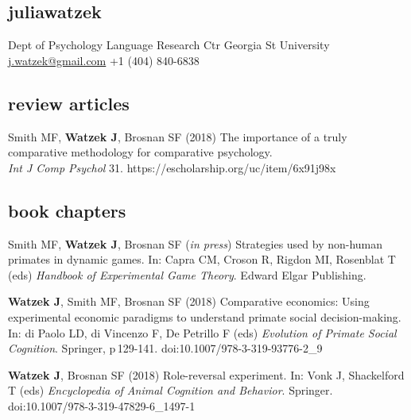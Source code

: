 \documentclass[]{friggeri-cv}
\begin{document}
\begin{aside}
  \section{{\normalfont julia}watzek}
    Dept of Psychology
    Language Research Ctr
    Georgia St University
    ~
    \href{mailto:j.watzek@gmail.com}{j.watzek@gmail.com}
    +1 (404) 840-6838
\end{aside}


\subsection{review articles}

\begin{enumerate}[resume, label={[\,\arabic*\,]}]
  \item {Smith MF, \textbf{Watzek J}, Brosnan SF (2018) The importance of a truly comparative methodology for comparative psychology. \\\emph{Int J Comp Psychol} 31. https://escholarship.org/uc/item/6x91j98x}
\end{enumerate}


\subsection{book chapters}

\begin{enumerate}[resume, label={[\,\arabic*\,]}]
  \item Smith MF, \textbf{Watzek J}, Brosnan SF (\emph{in press}) Strategies used by non-human primates in dynamic games. In: Capra CM, Croson R, Rigdon MI, Rosenblat T (eds) \emph{Handbook of Experimental Game Theory}. Edward Elgar Publishing.
  \item \textbf{Watzek J}, Smith MF, Brosnan SF (2018) Comparative economics: Using experimental economic paradigms to understand primate social decision-making. In: di Paolo LD, di Vincenzo F, De Petrillo F (eds) \emph{Evolution of Primate Social Cognition}. Springer, p\,129-141. doi:10.1007/978-3-319-93776-2\_9
  \item \textbf{Watzek J}, Brosnan SF (2018) Role-reversal experiment. In: Vonk J, Shackelford T (eds) \emph{Encyclopedia of Animal Cognition and Behavior}. Springer. doi:10.1007/978-3-319-47829-6\_1497-1
\end{enumerate}
\end{document}
